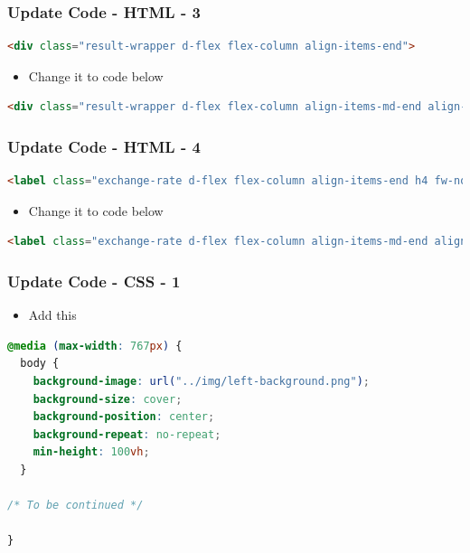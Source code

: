 \documentclass[aspectratio=169, table]{beamer}
\begin{document}
\begin{frame}[fragile]
    \frametitle{Update Code - HTML - 3}
    \vskip1cm
    \begin{lstlisting}[language=HTML]
<div class="result-wrapper d-flex flex-column align-items-end">
    \end{lstlisting}
 	
	\begin{itemize}
        \item Change it to code below
   	 \end{itemize}

\begin{lstlisting}[language=HTML]
<div class="result-wrapper d-flex flex-column align-items-md-end align-items-center">
    \end{lstlisting}
\end{frame}

\begin{frame}[fragile]
    \frametitle{Update Code - HTML - 4}
    \vskip1cm
    \begin{lstlisting}[language=HTML]
<label class="exchange-rate d-flex flex-column align-items-end h4 fw-normal" id="exchange-rate">1 USD = 15.000 IDR</label>
    \end{lstlisting}
 	
	\begin{itemize}
        \item Change it to code below
   	 \end{itemize}

\begin{lstlisting}[language=HTML]
<label class="exchange-rate d-flex flex-column align-items-md-end align-items-center h4 fw-normal" id="exchange-rate">1 USD = 15.000 IDR</label>
    \end{lstlisting}
\end{frame}

\begin{frame}[fragile]
    \frametitle{Update Code - CSS - 1}
    \vskip1cm
	\begin{itemize}
        \item Add this
   	 \end{itemize}

\begin{lstlisting}[language=CSS]
@media (max-width: 767px) {
  body {
    background-image: url("../img/left-background.png");
    background-size: cover;
    background-position: center;
    background-repeat: no-repeat;
    min-height: 100vh;
  }

/* To be continued */

}

    \end{lstlisting}
\end{frame}
\end{document}
